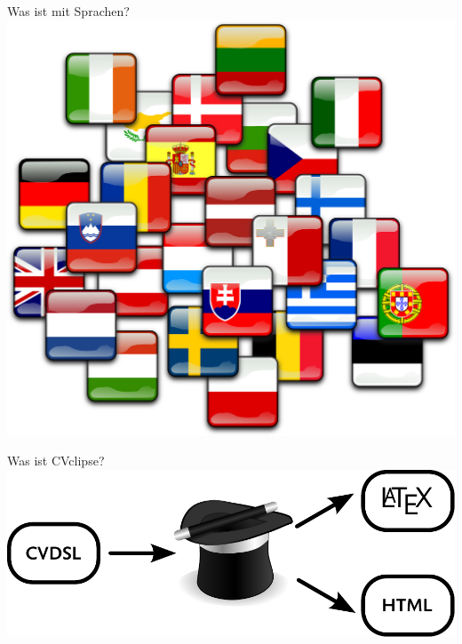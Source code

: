 \documentclass[fleqn,11pt,nexus]{beamer}
\begin{document}
\begin{frame}{Was ist mit Sprachen?}
	\centering
	\includegraphics[scale=0.075]{images/flags}
\end{frame}

\begin{frame}{Was ist CVclipse?}
	\centering
	\includegraphics[scale=0.7]{images/workflow}
\end{frame}
\end{document}
